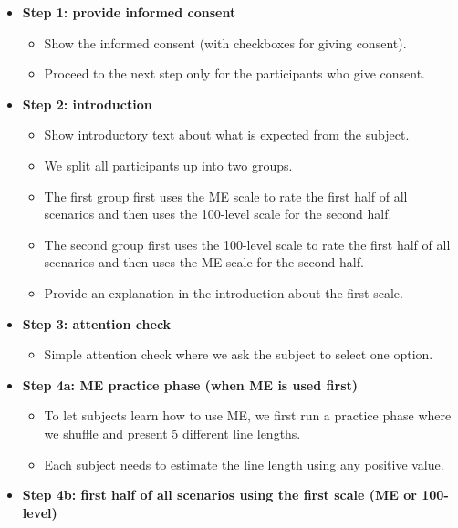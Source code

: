 \documentclass[a4paper]{article}
\begin{document}
\begin{itemize}[leftmargin=*, label={}]
    \item \textbf{Step 1: provide informed consent}
          \begin{itemize}
              \item Show the informed consent (with checkboxes for giving consent).
              \item Proceed to the next step only for the participants who give consent.
          \end{itemize}
    \item \textbf{Step 2: introduction}
          \begin{itemize}
              \item Show introductory text about what is expected from the subject.
              \item We split all participants up into two groups.
              \item The first group first uses the ME scale to rate the first half of all scenarios and then uses the 100-level scale for the second half.
              \item The second group first uses the 100-level scale to rate the first half of all scenarios and then uses the ME scale for the second half.
              \item Provide an explanation in the introduction about the first scale.
          \end{itemize}
    \item \textbf{Step 3: attention check}
          \begin{itemize}
              \item Simple attention check where we ask the subject to select one option.
          \end{itemize}
    \item \textbf{Step 4a: ME practice phase (when ME is used first)}
          \begin{itemize}
              \item To let subjects learn how to use ME, we first run a practice phase where we shuffle and present 5 different line lengths.
              \item Each subject needs to estimate the line length using any positive value.
          \end{itemize}
    \item \textbf{Step 4b: first half of all scenarios using the first scale (ME or 100-level)}
          \begin{itemize}

\end{itemize}
\end{itemize}
\end{document}
